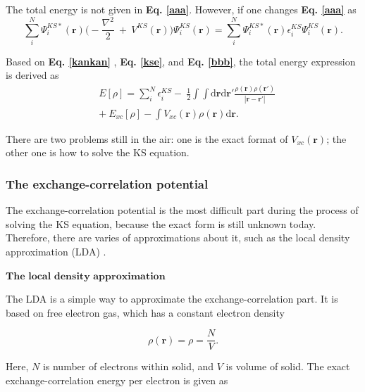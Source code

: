 \documentclass[a4paper, 12pt, titlepage,oneside,drop]{kthesis}
\begin{document}
The total energy is not given in \textbf{Eq. \ref{aaa}}. However, if one changes \textbf{Eq. \ref{aaa}} as 
\begin{equation}\label{bbb}
\sum\limits_i^N \Psi^{{KS}*}_{{i}}(\textbf{r}) \Big(-\frac{\nabla^{2}}{2}\ + \ V^{KS}(\textbf{r})\Big) \Psi^{{KS}}_{{i}}(\textbf{r}) = \sum\limits_i^N \Psi^{{KS}*}_{{i}}(\textbf{r}) \epsilon^{{KS}}_{{i}}  \Psi^{{KS}}_{{i}}(\textbf{r}).
\end{equation}

Based on \textbf{Eq. \ref{kankan}} , \textbf{Eq. \ref{kse}}, and \textbf{Eq. \ref{bbb}}, the total energy expression is derived as
\begin{equation}\label{totalenergy}
\begin{split}
& E[\rho] = \sum\limits_i^N \epsilon^{{KS}}_{{i}} - \ \frac{1}{2} \int \int \mathrm{d} {\textbf{r}} \mathrm{d}{\textbf{r}'} \frac{\rho({\textbf{r}})\rho(\textbf{r}')}{|{\textbf{r}}-{\textbf{r}}'|} \\
&    + \ E_{xc}[\rho] - \int   V_{xc}(\textbf{r}) \rho({\textbf{r}}) \mathrm{d} {\textbf{r}}.
\end{split}
\end{equation}

There are two problems still in the air: one is the exact format of $V_{xc}(\textbf{r})$; the other one is how to solve the KS equation.

\subsubsection{The exchange-correlation potential}

The exchange-correlation potential is the most difficult part during the process of solving the KS equation, because the exact form is still unknown today. Therefore, there
 are varies of approximations about it, such as the local density approximation (LDA) \cite{martin2004electronic, Cottenierwien2k, kohn1965self, von1972local, hedin1971explicit}.

$\textbf{The local density approximation}$

The LDA is a simple way to approximate the exchange-correlation part. It is based on free electron gas, which has a constant electron density 

\begin{equation}
 \rho(\textbf{r}) = \rho = \frac{N}{V}.
\end{equation}

Here, $N$ is number of electrons within solid, and $V$ is volume of solid. The exact exchange-correlation energy per electron is given as
\end{document}
